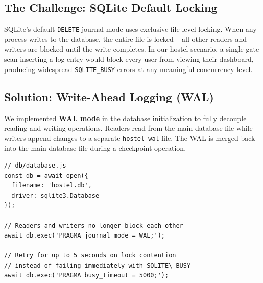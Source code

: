 \documentclass[sigconf]{acmart}
\newcommand{\theadbf}[1]{\textbf{#1}}
\begin{document}
\subsection{The Challenge: SQLite Default Locking}

SQLite's default \texttt{DELETE} journal mode uses exclusive file-level locking. When any process writes to the database, the entire file is locked -- all other readers and writers are blocked until the write completes. In our hostel scenario, a single gate scan inserting a log entry would block every user from viewing their dashboard, producing widespread \texttt{SQLITE\_BUSY} errors at any meaningful concurrency level. 


\subsection{Solution: Write-Ahead Logging (WAL)}

We implemented \textbf{WAL mode} in the database initialization to fully decouple reading and writing operations. Readers read from the main database file while writers append changes to a separate \texttt{hostel-wal} file. The WAL is merged back into the main database file during a checkpoint operation.

\begin{lstlisting}[style=jsstyle, caption={WAL Mode and busy timeout configuration (db/database.js)}]
// db/database.js
const db = await open({
  filename: 'hostel.db',
  driver: sqlite3.Database
});

// Readers and writers no longer block each other
await db.exec('PRAGMA journal_mode = WAL;');

// Retry for up to 5 seconds on lock contention
// instead of failing immediately with SQLITE\_BUSY
await db.exec('PRAGMA busy_timeout = 5000;');
\end{lstlisting}
\end{document}
